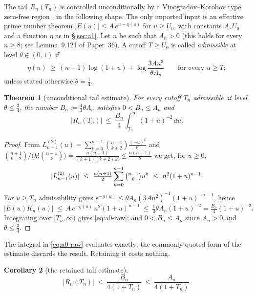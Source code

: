 \documentclass[11pt]{amsart}
\newtheorem{theorem}{Theorem}[section]
\newtheorem{corollary}[theorem]{Corollary}
\theoremstyle{definition}
\theoremstyle{remark}
\theoremstyle{definition}
\begin{document}
The tail $R_n(T_n)$ is controlled unconditionally by a Vinogradov--Korobov type zero-free region
\cite{Korobov,MTY}, in the following shape. The only imported input is an effective prime number
theorem $|E(u)|\le A\,e^{u-\eta(u)}$ for $u\ge U_0$, with constants $A,U_0$ and a function $\eta$
as in \S\ref{sec:a1}. Let $n$ be such that $A_n>0$ (this holds for every $n\ge8$; see Lemma~9.121 of
Paper~36). A cutoff $T\ge U_0$ is called \emph{admissible} at level $\theta\in(0,1)$
if
\begin{equation*}
   \eta(u)\ \ge\ (n+1)\log(1+u)+\log\frac{3An^2}{\theta A_n}\qquad\text{for every }u\ge T ;
\end{equation*}
unless stated otherwise $\theta=\tfrac14$.

\begin{theorem}[unconditional tail estimate]\label{thm:a0}
For every cutoff $T_n$ admissible at level $\theta\le\tfrac34$, the number $B_n:=\tfrac43\theta A_n$
satisfies $0<B_n\le A_n$ and
\begin{equation}\label{eq:a0-raw}
   |R_n(T_n)|\ \le\ \frac{B_n}{4}\int_{T_n}^\infty(1+u)^{-2}\,du .
\end{equation}
\end{theorem}

\begin{proof}
From $L^{(2)}_{n-1}(u)=\sum_{k=0}^{n-1}\binom{n+1}{k+2}\frac{(-u)^k}{k!}$ and
$\binom{n+1}{k+2}\big/\bigl(k!\binom{n-1}{k}\bigr)=\frac{n(n+1)}{(k+1)(k+2)\,k!}\le\frac{n(n+1)}2$
we get, for $u\ge0$,
\[
   |L^{(2)}_{n-1}(u)|\ \le\ \tfrac{n(n+1)}2\sum_{k=0}^{n-1}\tbinom{n-1}{k}u^k\ \le\ n^2(1+u)^{n-1}.
\]
For $u\ge T_n$ admissibility gives $e^{-\eta(u)}\le\theta A_n(3An^2)^{-1}(1+u)^{-n-1}$, hence
\[
   |E(u)K_n(u)|\ \le\ A\,e^{-\eta(u)}\,n^2(1+u)^{n-1}\ \le\ \tfrac13\theta A_n(1+u)^{-2}
   =\tfrac{B_n}{4}(1+u)^{-2}.
\]
Integrating over $[T_n,\infty)$ gives \eqref{eq:a0-raw}; and $0<B_n\le A_n$ since $A_n>0$ and
$\theta\le\tfrac34$.
\end{proof}

The integral in \eqref{eq:a0-raw} evaluates exactly; the commonly quoted form of the estimate
discards the result. Retaining it costs nothing.

\begin{corollary}[the retained tail estimate]\label{cor:a0plus}
\begin{equation}\label{eq:a0plus}
   |R_n(T_n)|\ \le\ \frac{B_n}{4(1+T_n)}\ \le\ \frac{A_n}{4(1+T_n)} .
\end{equation}
\end{corollary}
\end{document}
